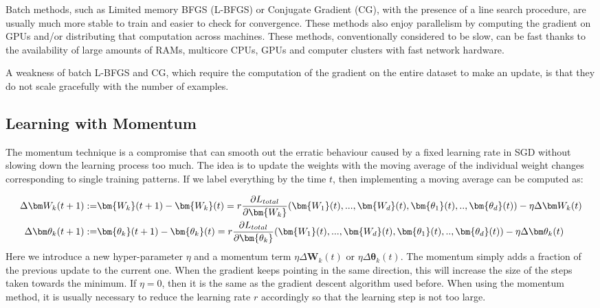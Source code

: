 Batch methods, such as Limited memory BFGS (L-BFGS) or Conjugate Gradient 
(CG), with the presence of a line search procedure, are usually much more 
stable to train and easier to check for convergence. These methods also 
enjoy parallelism by computing the gradient on GPUs and/or distributing that 
computation across machines. These methods, conventionally considered to be 
slow, can be fast thanks to the availability of large amounts of RAMs, 
multicore CPUs, GPUs and computer clusters with fast network hardware.

A weakness of batch L-BFGS and CG, which require the computation of the 
gradient on the entire dataset to make an update, is that they do not scale 
gracefully with the number of examples.

\subsection{Learning with Momentum}
The momentum technique is a compromise that can smooth out the erratic behaviour caused by a fixed learning rate in SGD without slowing down the learning process too much. The idea is to update the weights with the moving average of the individual weight changes corresponding to single training patterns.
If we label everything by the time $t$, then implementing a moving average can be computed as:

\begin{equation}
\label{emom}
\aligned
\Delta \bm W_k(t+1) :=& \bm{W_k}(t+1) - \bm{W_k}(t) = r\frac{\partial L_{total}}{\partial \bm{W_k}}(\bm{W_1}(t),...,\bm{W_d}(t),\bm{\theta_1}(t),..,\bm{\theta_d}(t)) -  \eta\Delta\bm W_k(t)\\
\Delta \bm \theta_k(t+1) :=& \bm{\theta_k}(t+1)-\bm{\theta_k}(t) = r\frac{\partial L_{total}}{\partial \bm{\theta_k}}(\bm{W_1}(t),...,\bm{W_d}(t),\bm{\theta_1}(t),..,\bm{\theta_d}(t)) - \eta\Delta \bm\theta_k(t)
\endaligned
\end{equation}
Here we introduce a new hyper-parameter $\eta$ and a momentum term $\eta\Delta
\bm W_k(t)$ or $\eta\Delta\bm \theta_k(t)$. The momentum simply adds a fraction of the previous update to the current one.  When the gradient keeps pointing in the same direction, this will increase the size of the steps taken towards the minimum. If $\eta=0$, then it is the same as the gradient descent algorithm used before. When using the momentum method, it is usually necessary to reduce the learning rate $r$ accordingly so that the learning step is not too large.



